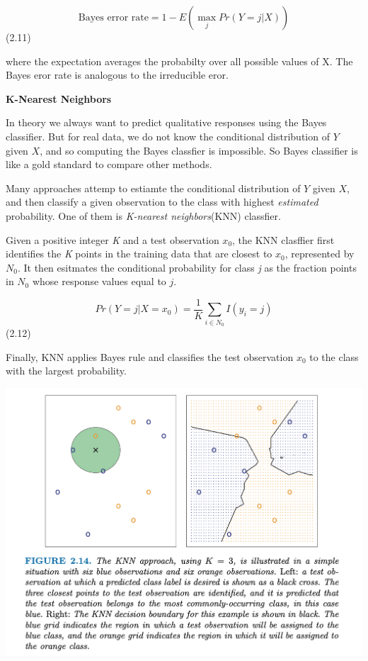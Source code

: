\documentclass[
  letterpaper,
  DIV=11,
  numbers=noendperiod]{scrreprt}
\begin{document}
\[
\text{Bayes error rate} = 1 - E(\max_jPr(Y =j | X))
\] (2.11)

where the expectation averages the probabilty over all possible values
of X. The Bayes eror rate is analogous to the irreducible eror.

\textbf{K-Nearest Neighbors}

In theory we always want to predict qualitative responses using the
Bayes classifier. But for real data, we do not know the conditional
distribution of \(Y\) given \(X\), and so computing the Bayes classfier
is impossible. So Bayes classifier is like a gold standard to compare
other methods.

Many approaches attemp to estiamte the conditional distribution of \(Y\)
given \(X\), and then classify a given observation to the class with
highest \emph{estimated} probability. One of them is \emph{K-nearest
neighbors}(KNN) classfier.

Given a positive integer \emph{K} and a test observation \(x_0\), the
KNN clasffier first identifies the \emph{K} points in the training data
that are closest to \(x_0\), represented by \(N_0\). It then esitmates
the conditional probability for class \emph{j} as the fraction points in
\(N_0\) whose response values equal to \(j\).

\[
Pr(Y = j | X = x_0) = \frac{1}{K}\sum_{i \in N_0}I(y_i=j)
\] (2.12)

Finally, KNN applies Bayes rule and classifies the test observation
\(x_0\) to the class with the largest probability.

\includegraphics{fig2.14.png}
\end{document}
